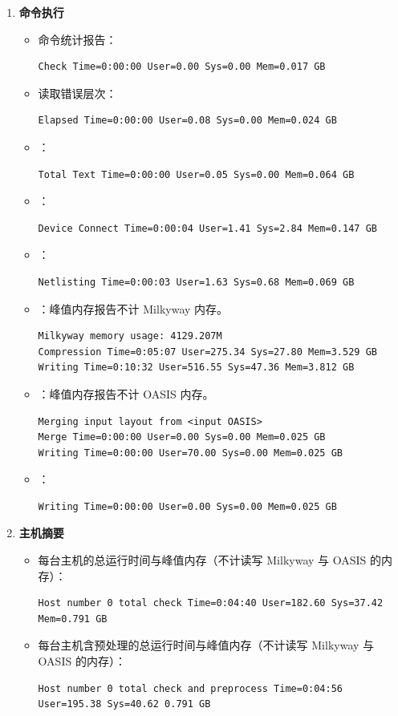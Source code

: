 \begin{enumerate}
  \item \textbf{命令执行}
  \begin{itemize}
    \item 命令统计报告：
\begin{lstlisting}
Check Time=0:00:00 User=0.00 Sys=0.00 Mem=0.017 GB
\end{lstlisting}
    \item 读取错误层次：
\begin{lstlisting}
Elapsed Time=0:00:00 User=0.08 Sys=0.00 Mem=0.024 GB
\end{lstlisting}
    \item {}：
\begin{lstlisting}
Total Text Time=0:00:00 User=0.05 Sys=0.00 Mem=0.064 GB
\end{lstlisting}
    \item {}：
\begin{lstlisting}
Device Connect Time=0:00:04 User=1.41 Sys=2.84 Mem=0.147 GB
\end{lstlisting}
    \item {}：
\begin{lstlisting}
Netlisting Time=0:00:03 User=1.63 Sys=0.68 Mem=0.069 GB
\end{lstlisting}
    \item {}：峰值内存报告不计 Milkyway 内存。
\begin{lstlisting}
Milkyway memory usage: 4129.207M
Compression Time=0:05:07 User=275.34 Sys=27.80 Mem=3.529 GB
Writing Time=0:10:32 User=516.55 Sys=47.36 Mem=3.812 GB
\end{lstlisting}
    \item {}：峰值内存报告不计 OASIS 内存。
\begin{lstlisting}
Merging input layout from <input OASIS>
Merge Time=0:00:00 User=0.00 Sys=0.00 Mem=0.025 GB
Writing Time=0:00:00 User=70.00 Sys=0.00 Mem=0.025 GB
\end{lstlisting}
    \item {}：
\begin{lstlisting}
Writing Time=0:00:00 User=0.00 Sys=0.00 Mem=0.025 GB
\end{lstlisting}
  \end{itemize}

  \item \textbf{主机摘要}
  \begin{itemize}
    \item 每台主机的总运行时间与峰值内存（不计读写 Milkyway 与 OASIS 的内存）：
\begin{lstlisting}
Host number 0 total check Time=0:04:40 User=182.60 Sys=37.42 Mem=0.791 GB
\end{lstlisting}
    \item 每台主机含预处理的总运行时间与峰值内存（不计读写 Milkyway 与 OASIS 的内存）：
\begin{lstlisting}
Host number 0 total check and preprocess Time=0:04:56 User=195.38 Sys=40.62 0.791 GB
\end{lstlisting}
  \end{itemize}


\end{enumerate}
